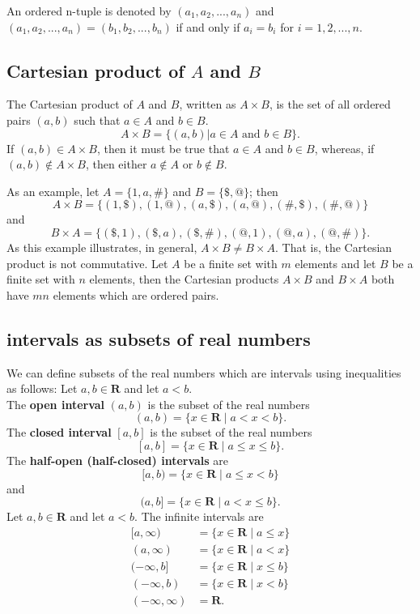 \documentclass{article}
\begin{document}
    An ordered n-tuple is denoted by $(a_1,a_2,...,a_n)$ and $(a_1,a_2,...,a_n) = (b_1,b_2,...,b_n)$ if and only if $a_i = b_i$ for $i = 1,2,...,n$.

    \subsection{Cartesian product of $A$ and $B$}

    The Cartesian product of $A$ and $B$, written as $A \times B$, is the set of all ordered pairs $(a,b)$ such that $a \in A$ and $b \in B$.
    $$
    A \times B = \{(a,b) | a \in A \textrm{ and } b \in B\}.
    $$
    If $(a,b) \in A \times B$, then it must be true that $a \in A$ and $b \in B$, whereas, if $(a,b) \notin A \times B$, then either $a \notin A$ or $b \notin B$.

    As an example, let $A=\{1, a, \#\}$ and $B=\{\$, @\}$; then
    $$
    A \times B=\{(1, \$),(1, @),(a, \$),(a, @),(\#, \$),(\#, @)\}
    $$
    and
    $$
    B \times A=\{(\$, 1),(\$, a),(\$, \#),(@, 1),(@, a),(@, \#)\} .
    $$
    As this example illustrates, in general, $A \times B \neq B \times A$. That is, the Cartesian product is not commutative. Let $A$ be a finite set with $m$ elements and let $B$ be a finite set with $n$ elements, then the Cartesian products $A \times B$ and $B \times A$ both have $mn$ elements which are ordered pairs.

    \subsection{intervals as subsets of real numbers}

    We can define subsets of the real numbers which are intervals using inequalities as follows: Let $a, b \in \mathbf{R}$ and let $a<b$. \\
    The \textbf{open interval} $(a, b)$ is the subset of the real numbers
    $$
    (a, b)=\{x \in \mathbf{R} \mid a<x<b\} .
    $$
    The \textbf{closed interval} $[a, b]$ is the subset of the real numbers
    $$
    [a, b]=\{x \in \mathbf{R} \mid a \leq x \leq b\} .
    $$
    The \textbf{half-open (half-closed) intervals} are
    $$
    [a, b)=\{x \in \mathbf{R} \mid a \leq x<b\}
    $$
    and
    $$
    (a, b]=\{x \in \mathbf{R} \mid a<x \leq b\} .
    $$
    Let $a, b \in \mathbf{R}$ and let $a<b$. The infinite intervals are
    $$
    \begin{aligned}
    {[a, \infty) } &=\{x \in \mathbf{R} \mid a \leq x\} \\
    (a, \infty) &=\{x \in \mathbf{R} \mid a<x\} \\
    (-\infty, b] &=\{x \in \mathbf{R} \mid x \leq b\} \\
    (-\infty, b) &=\{x \in \mathbf{R} \mid x<b\} \\
    (-\infty, \infty) &=\mathbf{R} .
    \end{aligned}
    $$
\end{document}
